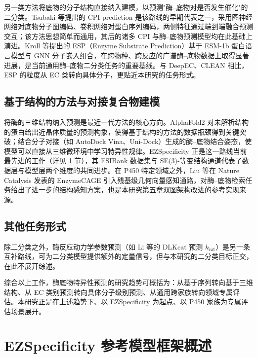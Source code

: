 另一类方法将底物的分子结构直接纳入建模，以预测"酶--底物对是否发生催化"的二分类。Tsubaki 等提出的 CPI-prediction\cite{CPI2019} 是该路线的早期代表之一，采用图神经网络对底物分子图编码、卷积网络对蛋白序列编码，两侧特征通过端到端融合预测交互；该方法思想简单而通用，其后的诸多 CPI 与酶--底物预测模型均在此基础上演进。Kroll 等提出的 ESP\cite{ESP2023}（Enzyme Substrate Prediction）基于 ESM-1b 蛋白语言模型与 GNN 分子嵌入组合，在跨物种、跨反应的广谱酶--底物数据上取得显著进展，是当前通用酶--底物二分类任务的重要基线。与 DeepEC、CLEAN 相比，ESP 的粒度从 EC 类转向具体分子，更贴近本研究的任务形式。

\subsection{基于结构的方法与对接复合物建模}
\label{subsec:methods-structure}

将酶的三维结构纳入预测是最近一代方法的核心方向。AlphaFold2\cite{AlphaFold2} 对未解析结构的蛋白给出近晶体质量的预测构象，使得基于结构的方法的数据瓶颈得到关键突破；结合分子对接（如 AutoDock Vina\cite{Vina2010,Vina2021}、Uni-Dock\cite{UniDock2023}）生成的酶--底物结合姿态，使模型可以直接从三维微环境中学习特异性规律。EZSpecificity\cite{EZSpec2025} 正是这一路线当前最先进的工作（详见 \ref{sec:ezspec-overview} 节），其 ESIBank 数据集与 SE(3)-等变结构通道代表了数据层与模型层两个维度的共同进步。在 P450 特定领域之外，Liu 等在 Nature Catalysis 发表的 EnzymeCAGE\cite{EnzymeCAGE2026} 引入残基级几何向量感知通路，对酶--底物检索任务给出了进一步的结构感知方案，也是本研究第五章双图架构改进的参考实现来源。

\subsection{其他任务形式}
\label{subsec:methods-other}

除二分类之外，酶反应动力学参数预测（如 Li 等的 DLKcat\cite{DLKcat2022} 预测 $k_{\mathrm{cat}}$）是另一条互补路线，可为二分类模型提供额外的定量信号，但与本研究的二分类目标正交，在此不展开综述。

综合以上工作，酶底物特异性预测的研究趋势可概括为：从基于序列转向基于三维结构、从 EC 类别预测转向具体分子级别预测、从通用跨家族转向领域专属评估。本研究正是在上述趋势下、以 EZSpecificity 为起点、以 P450 家族为专属评估场景展开。

\section{EZSpecificity 参考模型框架概述}
\label{sec:ezspec-overview}


